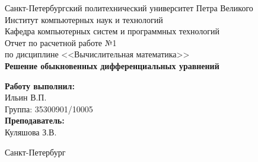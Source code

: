 \begin{titlepage}
		\begin{center}
			\large Санкт-Петербургский политехнический университет Петра Великого\\
			\large Институт компьютерных наук и технологий \\
			\large Кафедра компьютерных систем и программных технологий\\[6cm]


			\huge Отчет по расчетной работе №1\\[0.5cm]
			\large по дисциплине <<Вычислительная математика>>\\[0.1cm]
			\large\textbf{Решение обыкновенных дифференциальных уравнений}\\[5cm]
		\end{center}


		\begin{flushright}
			\begin{minipage}{0.25\textwidth}
				\begin{flushleft}

					\large\textbf{Работу выполнил:}\\
					\large Ильин В.П.\\
					\large {Группа:} 35300901/10005\\

					\large \textbf{Преподаватель:}\\
					\large Куляшова З.В.

				\end{flushleft}
			\end{minipage}
		\end{flushright}

		\vfill

		\begin{center}
			\large Санкт-Петербург\\
			\large \the\year
		\end{center}
	\end{titlepage}

	\vfill
	\newpage
